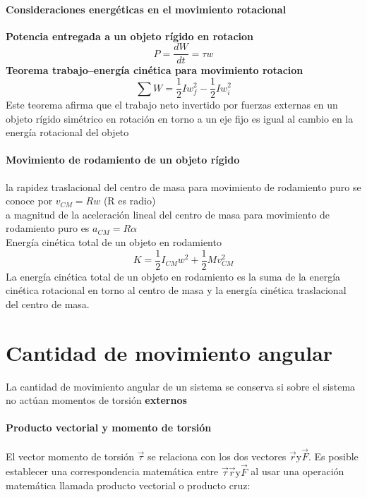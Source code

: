 \documentclass[10pt]{article}
\begin{document}
\paragraph{Consideraciones energéticas en el movimiento rotacional}

\textbf{ Potencia entregada a un objeto rígido en rotacion}
\begin{equation*}
	P = \dfrac{dW}{dt} = \tau w
\end{equation*}
\textbf{Teorema trabajo–energía cinética para movimiento rotacion}
\begin{equation*}
	\sum W = \frac{1}{2}Iw_f^2 - \frac{1}{2}Iw_i^2
\end{equation*}
Este teorema afirma que el trabajo neto invertido
por fuerzas externas en un objeto rígido simétrico en rotación en torno a un eje fijo es
igual al cambio en la energía rotacional del objeto
\paragraph{Movimiento de rodamiento de un objeto rígido}

la rapidez traslacional del centro de masa para movimiento de rodamiento puro
se conoce por $v_{CM} = Rw$ (R es radio)\\
 a magnitud de la aceleración lineal del centro de masa para movimiento de rodamiento puro es $a_{CM} = R\alpha$\\
\linebreak
Energía cinética total de un objeto en rodamiento
\begin{equation*}
	K = \frac{1}{2} I_{CM}w^2 + \frac{1}{2} Mv_{CM}^2
\end{equation*}
La energía cinética total de un objeto en rodamiento es la suma de la energía cinética rotacional en torno al centro de masa y la energía cinética traslacional del centro de masa.
\section{Cantidad de movimiento angular}

La cantidad de movimiento angular de un sistema se conserva si sobre el sistema no actúan momentos de torsión \textbf{externos}

\paragraph{Producto vectorial y momento de torsión}

El vector momento de torsión $\overrightarrow{\tau}$ se relaciona con los dos vectores $ \overrightarrow{r} \text{y} \overrightarrow{F}$. Es posible establecer una correspondencia matemática entre $\overrightarrow{\tau} \overrightarrow{r} \text{y} \overrightarrow{F}$ al usar una operación matemática llamada producto vectorial o producto cruz:
\end{document}
